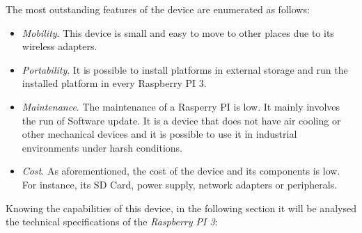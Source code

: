 The most outstanding features of the device are enumerated as follows:

\begin{itemize}

\item \textit{Mobility}. This device is small and easy to move to other places due to its wireless adapters.

\item \textit{Portability}. It is possible to install platforms in external storage and run the installed platform in every Raspberry PI 3.

\item \textit{Maintenance}. The maintenance of a Rasperry PI is low. It mainly involves the run of Software update. It is a device that does not have air cooling or other mechanical devices and it is possible to use it in industrial environments under harsh conditions.

\item \textit{Cost}. As aforementioned, the cost of the device and its components is low. For instance, its SD Card, power supply, network adapters or peripherals.

\end{itemize}

Knowing the capabilities of this device, in the following section it will be analysed the technical specifications of the \textit{Raspberry PI 3}:

